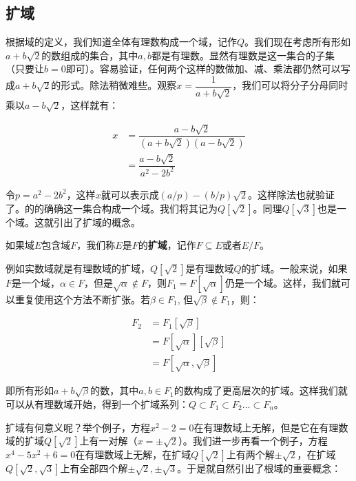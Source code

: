 \documentclass{article}
\begin{document}
\subsection{扩域}
根据域的定义，我们知道全体有理数构成一个域，记作$Q$。我们现在考虑所有形如$a + b\sqrt{2}$的数组成的集合，其中$a, b$都是有理数\cite{Goodman2011}。显然有理数是这一集合的子集（只要让$b=0$即可）。容易验证，任何两个这样的数做加、减、乘法都仍然可以写成$a + b \sqrt{2}$的形式。除法稍微难些。观察$x = \dfrac{1}{a + b\sqrt{2}}$，我们可以将分子分母同时乘以$a - b \sqrt{2}$，这样就有：

\[
\begin{array}{rl}
x & = \dfrac{a - b \sqrt{2}}{(a + b \sqrt{2})(a - b \sqrt{2})} \\[2ex]
  & = \dfrac{a - b \sqrt{2}}{a^2 - 2b^2}
\end{array}
\]

令$p = a^2 - 2b^2$，这样$x$就可以表示成$(a/p) -(b/p)\sqrt{2}$。这样除法也就验证了。的的确确这一集合构成一个域。我们将其记为$Q[\sqrt{2}]$。同理$Q[\sqrt{3}]$也是一个域。这就引出了扩域的概念。

\begin{definition}
如果域$E$包含域$F$，我们称$E$是$F$的\textbf{扩域}，记作$F \subseteq E$或者$E/F$。
\end{definition}

例如实数域就是有理数域的扩域，$Q[\sqrt{2}]$是有理数域$Q$的扩域。一般来说，如果$F$是一个域，$\alpha \in F$，但是$\sqrt{\alpha} \not\in F$，则$F_1 = F[\sqrt{\alpha}]$仍是一个域。这样，我们就可以重复使用这个方法不断扩张。若$\beta \in F_1$, 但$\sqrt{\beta} \not\in F_1$，则：

\[
\begin{array}{rl}
F_2 & = F_1[\sqrt{\beta}] \\
    & = F[\sqrt{\alpha}][\sqrt{\beta}] \\
    & = F[\sqrt{\alpha}, \sqrt{\beta}]
\end{array}
\]

即所有形如$a + b \sqrt{\beta}$的数，其中$a, b \in F_1$的数构成了更高层次的扩域。这样我们就可以从有理数域开始，得到一个扩域系列：$Q \subset F_1 \subset F_2 ... \subset F_n$。

扩域有何意义呢？举个例子，方程$x^2 - 2 = 0$在有理数域上无解，但是它在有理数域的扩域$Q[\sqrt{2}]$上有一对解（$x = \pm \sqrt{2}$）。我们进一步再看一个例子，方程$x^4 - 5x^2 + 6 = 0$在有理数域上无解，在扩域$Q[\sqrt{2}]$上有两个解$\pm \sqrt{2}$，在扩域$Q[\sqrt{2}, \sqrt{3}]$上有全部四个解$\pm \sqrt{2}, \pm \sqrt{3}$。于是就自然引出了根域的重要概念：
\end{document}
